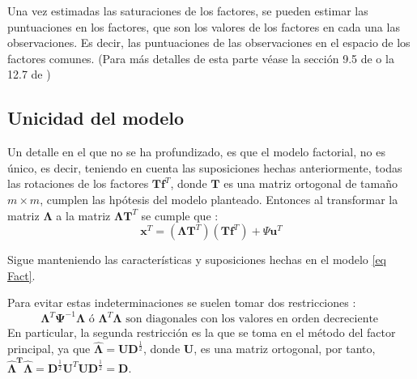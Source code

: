 \noindent Una vez estimadas las saturaciones de los factores, se pueden estimar las puntuaciones en los factores, que son los valores de los factores en cada una las observaciones. Es decir, las  puntuaciones de las observaciones en el espacio de los factores comunes. (Para más detalles de esta parte véase  la sección 9.5 de \cite{Johnson 2007} o la 12.7 de \cite{Peña 2002})

\subsection{Unicidad del modelo}

\noindent Un detalle en el que no se ha profundizado, es que el modelo factorial, no es único, es decir, teniendo en cuenta las suposiciones hechas anteriormente, todas las rotaciones de los factores $\mathbf{Tf}^T$, donde $\mathbf{T}$ es una matriz ortogonal de tamaño $m\times m$, cumplen las hpótesis del modelo planteado. Entonces al transformar la matriz $\mathbf{\Lambda}$ a la matriz $\mathbf{\Lambda T}^T$ se cumple que \cite{Mardia 1979}:
\begin{equation}
\mathbf{x}^T=(\mathbf{\Lambda T}^T)(\mathbf{Tf}^T)+\Psi\mathbf{u}^T
\end{equation}

Sigue manteniendo las características y suposiciones hechas en el modelo \ref{eq Fact}.

\noindent Para evitar estas indeterminaciones se suelen tomar dos restricciones \cite{Mardia 1979}:
\begin{equation}
\mathbf{\Lambda}^T \mathbf{\Psi}^{-1}\mathbf{\Lambda} \text{ ó } \mathbf{\Lambda}^T \mathbf{\Lambda} \text{ son diagonales con los valores en orden decreciente }
\end{equation}
\noindent En particular, la segunda restricción es la que se toma en el método del factor principal, ya que $\mathbf{\hat{\Lambda}}=\mathbf{UD}^{\frac{1}{2}}$, donde $\mathbf{U}$, es una matriz ortogonal, por tanto, $\mathbf{\hat{\Lambda}^T \hat{\Lambda}}=\mathbf{D}^{\frac{1}{2}}\mathbf{U}^T\mathbf{U}\mathbf{D}^{\frac{1}{2}}=\mathbf{D}$. 

